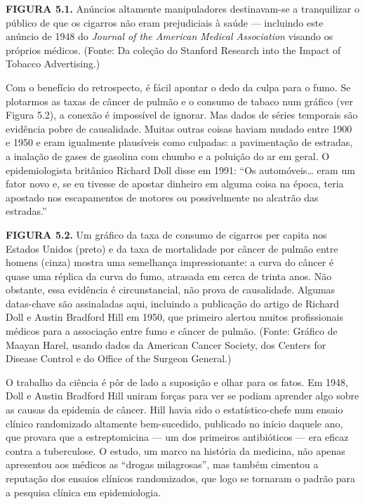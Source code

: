 \documentclass[11pt,a5paper,twoside]{book}
\begin{document}
\textbf{FIGURA 5.1.} Anúncios altamente manipuladores destinavam-se a tranquilizar o público de que os cigarros não eram prejudiciais à saúde — incluindo este anúncio de 1948 do \textit{Journal of the American Medical Association} visando os próprios médicos. (Fonte: Da coleção do Stanford Research into the Impact of Tobacco Advertising.)

Com o benefício do retrospecto, é fácil apontar o dedo da culpa para o fumo. Se plotarmos as taxas de câncer de pulmão e o consumo de tabaco num gráfico (ver Figura 5.2), a conexão é impossível de ignorar. Mas dados de séries temporais são evidência pobre de causalidade. Muitas outras coisas haviam mudado entre 1900 e 1950 e eram igualmente plausíveis como culpadas: a pavimentação de estradas, a inalação de gases de gasolina com chumbo e a poluição do ar em geral. O epidemiologista britânico Richard Doll disse em 1991: “Os automóveis… eram um fator novo e, se eu tivesse de apostar dinheiro em alguma coisa na época, teria apostado nos escapamentos de motores ou possivelmente no alcatrão das estradas.”

\textbf{FIGURA 5.2.} Um gráfico da taxa de consumo de cigarros per capita nos Estados Unidos (preto) e da taxa de mortalidade por câncer de pulmão entre homens (cinza) mostra uma semelhança impressionante: a curva do câncer é quase uma réplica da curva do fumo, atrasada em cerca de trinta anos. Não obstante, essa evidência é circunstancial, não prova de causalidade. Algumas datas-chave são assinaladas aqui, incluindo a publicação do artigo de Richard Doll e Austin Bradford Hill em 1950, que primeiro alertou muitos profissionais médicos para a associação entre fumo e câncer de pulmão. (Fonte: Gráfico de Maayan Harel, usando dados da American Cancer Society, dos Centers for Disease Control e do Office of the Surgeon General.)

O trabalho da ciência é pôr de lado a suposição e olhar para os fatos. Em 1948, Doll e Austin Bradford Hill uniram forças para ver se podiam aprender algo sobre as causas da epidemia de câncer. Hill havia sido o estatístico-chefe num ensaio clínico randomizado altamente bem-sucedido, publicado no início daquele ano, que provara que a estreptomicina — um dos primeiros antibióticos — era eficaz contra a tuberculose. O estudo, um marco na história da medicina, não apenas apresentou aos médicos as “drogas milagrosas”, mas também cimentou a reputação dos ensaios clínicos randomizados, que logo se tornaram o padrão para a pesquisa clínica em epidemiologia.
\end{document}
